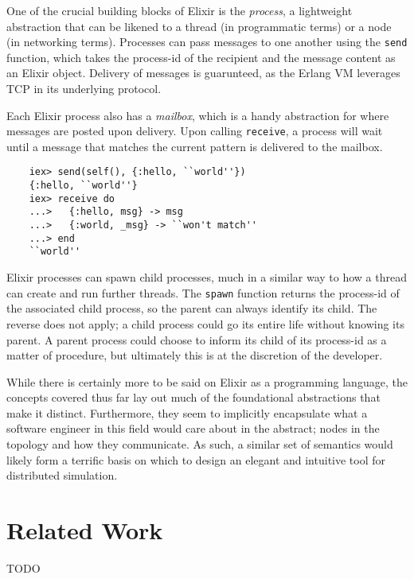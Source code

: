 One of the crucial building blocks of Elixir is the \emph{process}, a lightweight abstraction that can be likened to
a thread (in programmatic terms) or a node (in networking terms)\cite{elixir_processes}. Processes can pass messages
to one another using the \texttt{send} function, which takes the process-id of the recipient and the message content as
an Elixir object. Delivery of messages is guarunteed, as the Erlang VM leverages TCP in its underlying
protocol\cite{erlang_protocol}.

Each Elixir process also has a \emph{mailbox}, which is a handy abstraction for where messages are posted upon
delivery. Upon calling \texttt{receive}, a process will wait until a message that matches the current pattern is
delivered to the mailbox.

\begin{lstlisting}
    iex> send(self(), {:hello, ``world''})
    {:hello, ``world''}
    iex> receive do
    ...>   {:hello, msg} -> msg
    ...>   {:world, _msg} -> ``won't match''
    ...> end
    ``world''
\end{lstlisting}

Elixir processes can spawn child processes, much in a similar way to how a thread can create and run further threads.
The \texttt{spawn} function returns the process-id of the associated child process, so the parent can always identify
its child. The reverse does not apply; a child process could go its entire life without knowing its parent. A parent
process could choose to inform its child of its process-id as a matter of procedure, but ultimately this is at the
discretion of the developer.

While there is certainly more to be said on Elixir as a programming language, the concepts covered thus far lay out
much of the foundational abstractions that make it distinct. Furthermore, they seem to implicitly encapsulate what a
software engineer in this field would care about in the abstract; nodes in the topology and how they communicate.
As such, a similar set of semantics would likely form a terrific basis on which to design an elegant and intuitive
tool for distributed simulation.


\section{Related Work}

TODO
